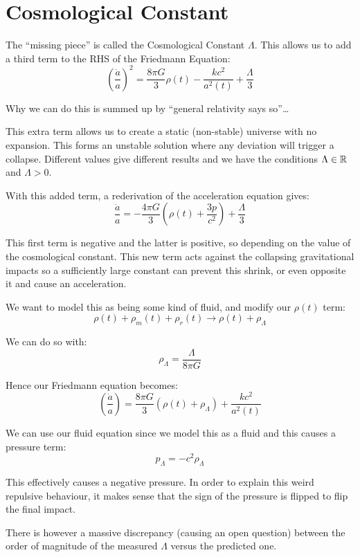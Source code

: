 
\section{Cosmological Constant}
The ``missing piece'' is called the Cosmological Constant $\Lambda$. This allows us to add a third term to the RHS of the Friedmann Equation:
\[
    \left(\frac{\dot{a}}{a}\right)^2 = \frac{8 \pi G}{3} \rho(t) - \frac{kc^2}{a^2(t)} + \frac{\Lambda}{3}
\]

Why we can do this is summed up by ``general relativity says so''\dots

This extra term allows us to create a static (non-stable) universe with no expansion. This forms an unstable solution where any deviation will trigger a collapse. Different values give different results and we have the conditions $\Lambda \in \mathbb{R}$ and $\Lambda > 0$.

With this added term, a rederivation of the acceleration equation gives:
\[
    \frac{\ddot{a}}{a} = - \frac{4 \pi G}{3} \left(\rho(t) + \frac{3p}{c^2}\right) + \frac{\Lambda}{3}
\]

This first term is negative and the latter is positive, so depending on the value of the cosmological constant. This new term acts against the collapsing gravitational impacts so a sufficiently large constant can prevent this shrink, or even opposite it and cause an acceleration.

We want to model this as being some kind of fluid, and modify our $\rho(t)$ term:
\[
    \rho(t) + \rho_m(t) + \rho_r(t) \to \rho(t) + \rho_\Lambda
\]

We can do so with:
\[
    \rho_\Lambda = \frac{\Lambda}{8 \pi G}
\]

Hence our Friedmann equation becomes:
\[
    \left(\frac{\dot{a}}{a}\right) = \frac{8 \pi G}{3} \left(\rho(t) + \rho_\Lambda\right) + \frac{kc^2}{a^2(t)}
\]

We can use our fluid equation since we model this as a fluid and this causes a pressure term:
\[
    p_\Lambda = - c^2 \rho_\Lambda
\]

This effectively causes a negative pressure. In order to explain this weird repulsive behaviour, it makes sense that the sign of the pressure is flipped to flip the final impact. 

There is however a massive discrepancy (causing an open question) between the order of magnitude of the measured $\Lambda$ versus the predicted one.

